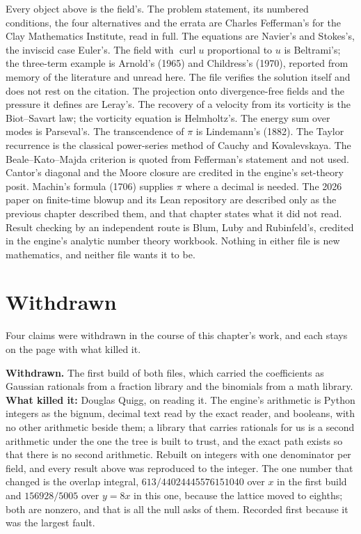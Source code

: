 Every object above is the field's. The problem statement, its numbered conditions, the four
alternatives and the errata are Charles Fefferman's for the Clay Mathematics Institute, read in full.
The equations are Navier's and Stokes's, the inviscid case Euler's. The field with
$\operatorname{curl}u$ proportional to $u$ is Beltrami's; the three-term example is Arnold's (1965)
and Childress's (1970), reported from memory of the literature and unread here. The file verifies
the solution itself and does not rest on the citation. The projection onto divergence-free fields and
the pressure it defines are Leray's. The recovery of a velocity from its vorticity is the Biot--Savart
law; the vorticity equation is Helmholtz's. The energy sum over modes is Parseval's. The
transcendence of $\pi$ is Lindemann's (1882). The Taylor recurrence is the classical power-series
method of Cauchy and Kovalevskaya. The Beale--Kato--Majda criterion is quoted from Fefferman's
statement and not used. Cantor's diagonal and the Moore closure are credited in the engine's
set-theory posit. Machin's formula (1706) supplies $\pi$ where a decimal is needed. The 2026 paper on
finite-time blowup and its Lean repository are described only as the previous chapter described them,
and that chapter states what it did not read. Result checking by an independent route is Blum, Luby
and Rubinfeld's, credited in the engine's analytic number theory workbook. Nothing in either file is
new mathematics, and neither file wants it to be.

\section{Withdrawn}

Four claims were withdrawn in the course of this chapter's work, and each stays on the page with what
killed it.

\textbf{Withdrawn.} The first build of both files, which carried the coefficients as Gaussian
rationals from a fraction library and the binomials from a math library. \textbf{What killed it:}
Douglas Quigg, on reading it. The engine's arithmetic is Python integers as the bignum, decimal text
read by the exact reader, and booleans, with no other arithmetic beside them; a library that carries
rationals for us is a second arithmetic under the one the tree is built to trust, and the exact path
exists so that there is no second arithmetic. Rebuilt on integers with one denominator per field, and
every result above was reproduced to the integer. The one number that changed is the overlap
integral, $613/44024445576151040$ over $x$ in the first build and $156928/5005$ over $y = 8x$ in this
one, because the lattice moved to eighths; both are nonzero, and that is all the null asks of them.
Recorded first because it was the largest fault.

